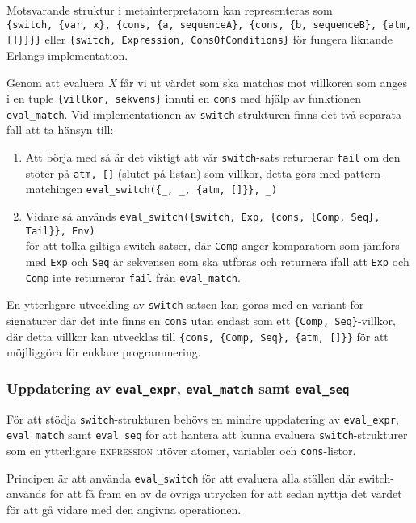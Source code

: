 \documentclass[a4paper, 11pt]{article}
\begin{document}
Motsvarande struktur i metainterpretatorn kan representeras som \\ \lstinline${switch, {var, x}, {cons, {a, sequenceA}, {cons, {b, sequenceB}, {atm, []}}}}$ eller \lstinline${switch, Expression, ConsOfConditions}$ för fungera liknande Erlangs implementation.

Genom att evaluera \textit{X} får vi ut värdet som ska matchas mot villkoren som anges i en tuple \lstinline${villkor, sekvens}$ innuti en \texttt{cons} med hjälp av funktionen \texttt{eval_match}. Vid implementationen av \texttt{switch}-strukturen finns det två separata fall att ta hänsyn till:

\begin{enumerate}
\item Att börja med så är det viktigt att vår \texttt{switch}-sats returnerar \texttt{fail} om den stöter på \texttt{atm, []} (slutet på listan) som villkor, detta görs med pattern-matchingen \lstinline$eval_switch({_, _, {atm, []}}, _)$
\item Vidare så används \lstinline$eval_switch({switch, Exp, {cons, {Comp, Seq}, Tail}}, Env)$\\ för att tolka giltiga switch-satser, där \texttt{Comp} anger komparatorn som jämförs med \texttt{Exp} och \texttt{Seq} är sekvensen som ska utföras och returnera ifall att \texttt{Exp} och \texttt{Comp} inte returnerar \texttt{fail} från \texttt{eval_match}.
\end{enumerate}

En ytterligare utveckling av \texttt{switch}-satsen kan göras med en variant för signaturer där det inte finns en \texttt{cons} utan endast som ett \lstinline|{Comp, Seq}|-villkor, där detta villkor kan utvecklas till \lstinline|{cons, {Comp, Seq}, {atm, []}}| för att möjlliggöra för enklare programmering.

\subsubsection{Uppdatering av \texttt{eval_expr}, \texttt{eval_match} samt \texttt{eval_seq}}

För att stödja \texttt{switch}-strukturen behövs en mindre uppdatering av \texttt{eval_expr}, \texttt{eval_match} samt \texttt{eval_seq} för att hantera att kunna evaluera \texttt{switch}-strukturer som en ytterligare \textsc{expression} utöver atomer, variabler och \texttt{cons}-listor.

Principen är att använda \texttt{eval_switch} för att evaluera alla ställen där switch-används för att få fram en av de övriga utrycken för att sedan nyttja det värdet för att gå vidare med den angivna operationen.
\end{document}
